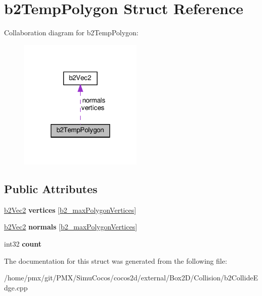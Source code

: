 \hypertarget{structb2TempPolygon}{}\section{b2\+Temp\+Polygon Struct Reference}
\label{structb2TempPolygon}


Collaboration diagram for b2\+Temp\+Polygon\+:
\nopagebreak
\begin{figure}[H]
\begin{center}
\leavevmode
\includegraphics[width=167pt]{structb2TempPolygon__coll__graph}
\end{center}
\end{figure}
\subsection*{Public Attributes}
\begin{DoxyCompactItemize}
\item 
\mbox{\label{structb2TempPolygon_a7351a98f6052d1fce66e11bfc5b98a3a}} 
\hyperlink{structb2Vec2}{b2\+Vec2} {\bfseries vertices} \mbox{[}\hyperlink{_2cocos2d_2external_2Box2D_2include_2Box2D_2Common_2b2Settings_8h_a09d71ee1993bee28b5b2e6d893b41884}{b2\+\_\+max\+Polygon\+Vertices}\mbox{]}
\item 
\mbox{\label{structb2TempPolygon_a45b9db5dcbcb66170029e9a2f524fc6a}} 
\hyperlink{structb2Vec2}{b2\+Vec2} {\bfseries normals} \mbox{[}\hyperlink{_2cocos2d_2external_2Box2D_2include_2Box2D_2Common_2b2Settings_8h_a09d71ee1993bee28b5b2e6d893b41884}{b2\+\_\+max\+Polygon\+Vertices}\mbox{]}
\item 
\mbox{\label{structb2TempPolygon_a5b08379f676f8498190c398d9ec3d0a5}} 
int32 {\bfseries count}
\end{DoxyCompactItemize}


The documentation for this struct was generated from the following file\+:\begin{DoxyCompactItemize}
\item 
/home/pmx/git/\+P\+M\+X/\+Simu\+Cocos/cocos2d/external/\+Box2\+D/\+Collision/b2\+Collide\+Edge.\+cpp\end{DoxyCompactItemize}
